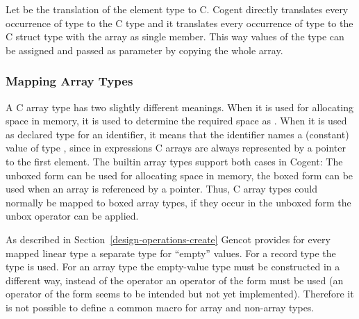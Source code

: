 Let  be the translation of the element type  to C. Cogent directly translates every occurrence
of type  to the C type  and it translates every occurrence of type  to the 
C struct type  with the array as single member. This way values of the type can be 
assigned and passed as parameter by copying the whole array.



\subsubsection{Mapping Array Types}

A C array type  has two slightly different meanings. When it is used for allocating space in memory,
it is used to determine the required space as . When it is used as declared type for an 
identifier, it means that the identifier names a (constant) value of type , since in expressions C arrays are 
always represented by a pointer to the first element. The builtin array types support both cases in Cogent:
The unboxed form can be used for allocating space in memory, the boxed form can be used when an array is
referenced by a pointer. Thus, C array types could normally be mapped to boxed array types, if they occur in 
the unboxed form the unbox operator can be applied.

As described in Section~\ref{design-operations-create} Gencot provides for every mapped linear type a separate type
for ``empty'' values. For a record type  the type  is used. For an array type
the empty-value type must be constructed in a different way, instead of the operator  
an operator of the form  must be used (an operator of the form  seems
to be intended but not yet implemented). Therefore it is not possible to define a common  macro for
array and non-array types.

